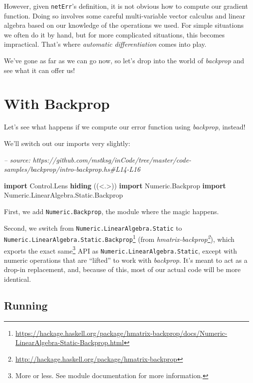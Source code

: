 \documentclass[]{article}
\newenvironment{Shaded}{}{}
\newcommand{\CommentTok}[1]{\textcolor[rgb]{0.38,0.63,0.69}{\textit{#1}}}
\newcommand{\DataTypeTok}[1]{\textcolor[rgb]{0.56,0.13,0.00}{#1}}
\newcommand{\KeywordTok}[1]{\textcolor[rgb]{0.00,0.44,0.13}{\textbf{#1}}}
\newcommand{\NormalTok}[1]{#1}
\renewcommand{\href}[2]{#2\footnote{\url{#1}}}
\begin{document}
However, given \texttt{netErr}'s definition, it is not obvious how to compute
our gradient function. Doing so involves some careful multi-variable vector
calculus and linear algebra based on our knowledge of the operations we used.
For simple situations we often do it by hand, but for more complicated
situations, this becomes impractical. That's where \emph{automatic
differentiation} comes into play.

We've gone as far as we can go now, so let's drop into the world of
\emph{backprop} and see what it can offer us!

\hypertarget{with-backprop}{%
\section{With Backprop}\label{with-backprop}}

Let's see what happens if we compute our error function using \emph{backprop},
instead!

We'll switch out our imports very slightly:

\begin{Shaded}
\begin{Highlighting}[]
\CommentTok{-- source: https://github.com/mstksg/inCode/tree/master/code-samples/backprop/intro-backprop.hs#L14-L16}

\KeywordTok{import}           \DataTypeTok{Control.Lens} \KeywordTok{hiding}\NormalTok{                   ((<.>))}
\KeywordTok{import}           \DataTypeTok{Numeric.Backprop}
\KeywordTok{import}           \DataTypeTok{Numeric.LinearAlgebra.Static.Backprop}
\end{Highlighting}
\end{Shaded}

First, we add \texttt{Numeric.Backprop}, the module where the magic happens.

Second, we switch from \texttt{Numeric.LinearAlgebra.Static} to
\href{https://hackage.haskell.org/package/hmatrix-backprop/docs/Numeric-LinearAlgebra-Static-Backprop.html}{\texttt{Numeric.LinearAlgebra.Static.Backprop}}
(from
\emph{\href{http://hackage.haskell.org/package/hmatrix-backprop}{hmatrix-backprop}}),
which exports the exact same\footnote{More or less. See module documentation for
  more information.} API as \texttt{Numeric.LinearAlgebra.Static}, except with
numeric operations that are ``lifted'' to work with \emph{backprop}. It's meant
to act as a drop-in replacement, and, because of this, most of our actual code
will be more identical.

\hypertarget{running-1}{%
\subsection{Running}\label{running-1}}
\end{document}
